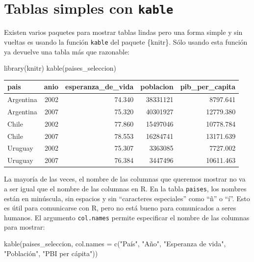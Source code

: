 \documentclass[
  openany]{book}
\newenvironment{Shaded}{\begin{snugshade}}{\end{snugshade}}
\newcommand{\AttributeTok}[1]{\textcolor[rgb]{0.77,0.63,0.00}{#1}}
\newcommand{\FunctionTok}[1]{\textcolor[rgb]{0.00,0.00,0.00}{#1}}
\newcommand{\NormalTok}[1]{#1}
\newcommand{\StringTok}[1]{\textcolor[rgb]{0.31,0.60,0.02}{#1}}
\begin{document}
\hypertarget{tablas-simples-con-kable}{%
\section{\texorpdfstring{Tablas simples con \texttt{kable}}{Tablas simples con kable}}\label{tablas-simples-con-kable}}

Existen varios paquetes para mostrar tablas lindas pero una forma simple y sin vueltas es usando la función \texttt{kable} del paquete \{knitr\}.
Sólo usando esta función ya devuelve una tabla más que razonable:

\begin{Shaded}
\begin{Highlighting}[]
\FunctionTok{library}\NormalTok{(knitr)}
\FunctionTok{kable}\NormalTok{(paises\_seleccion)}
\end{Highlighting}
\end{Shaded}

\begin{tabular}{l|r|r|r|r}
\hline
pais & anio & esperanza\_de\_vida & poblacion & pib\_per\_capita\\
\hline
Argentina & 2002 & 74.340 & 38331121 & 8797.641\\
\hline
Argentina & 2007 & 75.320 & 40301927 & 12779.380\\
\hline
Chile & 2002 & 77.860 & 15497046 & 10778.784\\
\hline
Chile & 2007 & 78.553 & 16284741 & 13171.639\\
\hline
Uruguay & 2002 & 75.307 & 3363085 & 7727.002\\
\hline
Uruguay & 2007 & 76.384 & 3447496 & 10611.463\\
\hline
\end{tabular}

La mayoría de las veces, el nombre de las columnas que queremos mostrar no va a ser igual que el nombre de las columnas en R.
En la tabla \texttt{paises}, los nombres están en minúscula, sin espacios y sin ``caracteres especiales'' como ``ñ'' o ``í''.
Esto es útil para comunicarse con R, pero no está bueno para comunicados a seres humanos.
El argumento \texttt{col.names} permite especificar el nombre de las columnas para mostrar:

\begin{Shaded}
\begin{Highlighting}[]
\FunctionTok{kable}\NormalTok{(paises\_seleccion, }
      \AttributeTok{col.names =} \FunctionTok{c}\NormalTok{(}\StringTok{"País"}\NormalTok{, }\StringTok{"Año"}\NormalTok{, }\StringTok{"Esperanza de vida"}\NormalTok{, }\StringTok{"Población"}\NormalTok{, }\StringTok{"PBI per cápita"}\NormalTok{))}
\end{Highlighting}
\end{Shaded}
\end{document}
